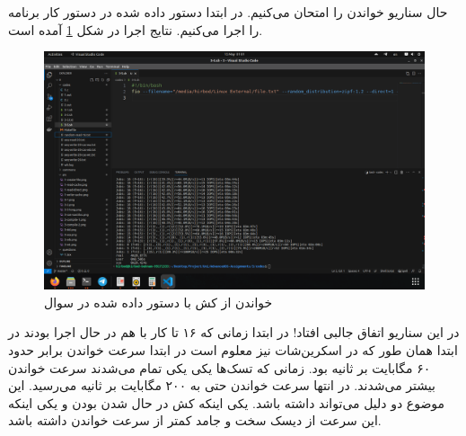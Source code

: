 حال سناریو خواندن را امتحان می‌کنیم. در ابتدا دستور داده شده در دستور کار برنامه را اجرا می‌کنیم.
نتایج اجرا در شکل
\ref{fig:3-rand-read-16}
آمده است.
\begin{figure}[H]
    \centering
    \includegraphics[scale=0.25]{pic/3-rand-read-16.png}
    \caption{خواندن از کش با دستور داده شده در سوال}
    \label{fig:3-rand-read-16}
\end{figure}
در این سناریو اتفاق جالبی افتاد! در ابتدا زمانی که ۱۶ تا کار با هم در حال اجرا بودند در ابتدا همان طور که در اسکرین‌شات
نیز معلوم است در ابتدا سرعت خواندن برابر حدود ۶۰ مگابایت بر ثانیه بود. زمانی که تسک‌ها یکی یکی تمام می‌شدند سرعت
خواندن بیشتر می‌شدند. در انتها سرعت خواندن حتی به ۲۰۰ مگابایت بر ثانیه می‌رسید. این موضوع دو دلیل می‌تواند داشته
باشد. یکی اینکه کش در حال
شدن بودن و یکی اینکه این سرعت
از دیسک سخت و جامد کمتر از سرعت خواندن
داشته باشد.

